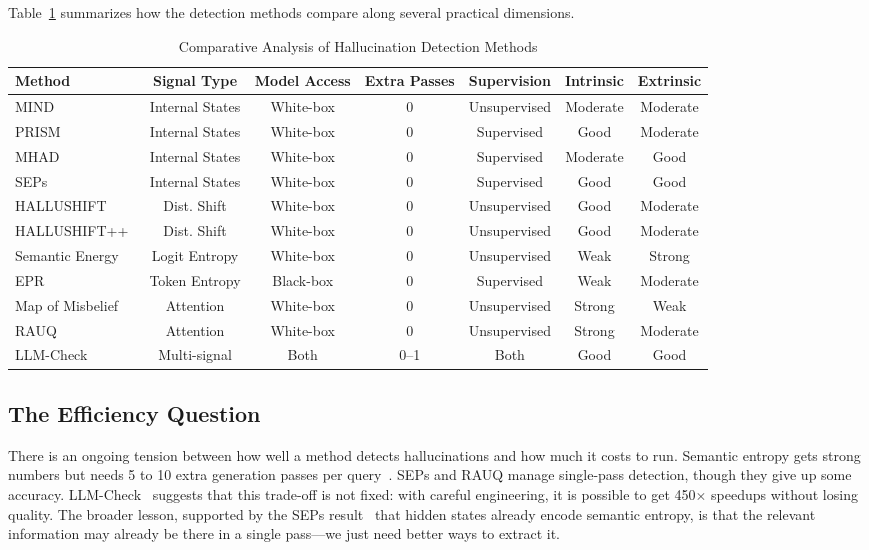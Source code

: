 \documentclass[journal]{IEEEtran}
\begin{document}
Table~\ref{tab:comparison} summarizes how the detection methods compare along several practical dimensions.

\begin{table}[!t]
\renewcommand{\arraystretch}{1.3}
\caption{Comparative Analysis of Hallucination Detection Methods}
\label{tab:comparison}
\centering
\begin{tabular}{l c c c c c c}
\toprule
\textbf{Method} & \textbf{Signal Type} & \textbf{Model Access} & \textbf{Extra Passes} & \textbf{Supervision} & \textbf{Intrinsic} & \textbf{Extrinsic} \\
\midrule
MIND~\cite{mind} & Internal States & White-box & 0 & Unsupervised & Moderate & Moderate \\
PRISM~\cite{prism} & Internal States & White-box & 0 & Supervised & Good & Moderate \\
MHAD~\cite{mhad} & Internal States & White-box & 0 & Supervised & Moderate & Good \\
SEPs~\cite{sep} & Internal States & White-box & 0 & Supervised & Good & Good \\
HALLUSHIFT~\cite{hallushift} & Dist. Shift & White-box & 0 & Unsupervised & Good & Moderate \\
HALLUSHIFT++~\cite{hallushift_pp} & Dist. Shift & White-box & 0 & Unsupervised & Good & Moderate \\
Semantic Energy~\cite{semantic_energy} & Logit Entropy & White-box & 0 & Unsupervised & Weak & Strong \\
EPR~\cite{epr} & Token Entropy & Black-box & 0 & Supervised & Weak & Moderate \\
Map of Misbelief~\cite{map_misbelief} & Attention & White-box & 0 & Unsupervised & Strong & Weak \\
RAUQ~\cite{rauq} & Attention & White-box & 0 & Unsupervised & Strong & Moderate \\
LLM-Check~\cite{llmcheck} & Multi-signal & Both & 0--1 & Both & Good & Good \\
\bottomrule
\end{tabular}
\end{table}

\subsection{The Efficiency Question}

There is an ongoing tension between how well a method detects hallucinations and how much it costs to run. Semantic entropy gets strong numbers but needs 5 to 10 extra generation passes per query~\cite{sep}. SEPs and RAUQ manage single-pass detection, though they give up some accuracy. LLM-Check~\cite{llmcheck} suggests that this trade-off is not fixed: with careful engineering, it is possible to get 450$\times$ speedups without losing quality. The broader lesson, supported by the SEPs result~\cite{sep} that hidden states already encode semantic entropy, is that the relevant information may already be there in a single pass---we just need better ways to extract it.
\end{document}
